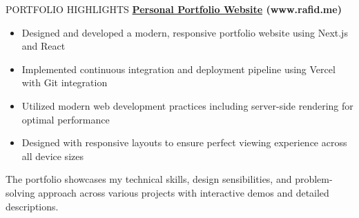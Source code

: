 \documentclass{resume} %
\begin{document}
\begin{rSection}{PORTFOLIO HIGHLIGHTS}
\textbf{\href{https://www.rafid.me}{Personal Portfolio Website} (www.rafid.me)}
\begin{itemize}
    \itemsep -3pt {}
    \item Designed and developed a modern, responsive portfolio website using Next.js and React
    \item Implemented continuous integration and deployment pipeline using Vercel with Git integration
    \item Utilized modern web development practices including server-side rendering for optimal performance
    \item Designed with responsive layouts to ensure perfect viewing experience across all device sizes
\end{itemize}

The portfolio showcases my technical skills, design sensibilities, and problem-solving approach across various projects with interactive demos and detailed descriptions.
\end{rSection}

\end{document}
